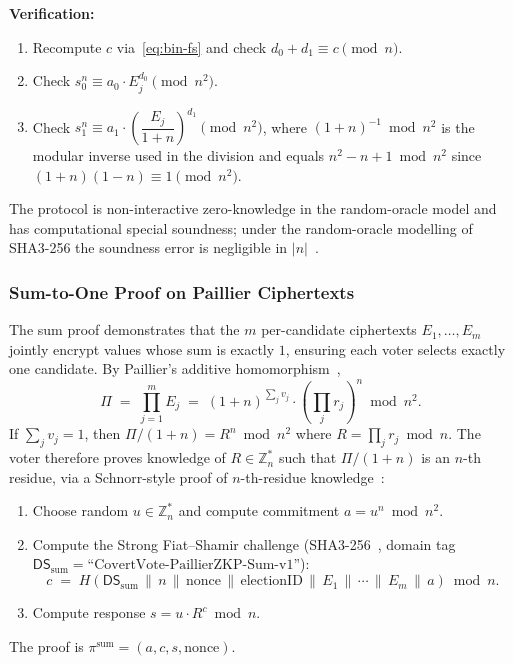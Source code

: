 \textbf{Verification:}
\begin{enumerate}
    \item Recompute $c$ via~\eqref{eq:bin-fs} and check $d_0 + d_1 \equiv c \pmod{n}$.
    \item Check $s_0^{n} \equiv a_0 \cdot E_j^{d_0} \pmod{n^2}$.
    \item Check $s_1^{n} \equiv a_1 \cdot \left(\dfrac{E_j}{1+n}\right)^{d_1} \pmod{n^2}$, where $(1+n)^{-1} \bmod n^2$ is the modular inverse used in the division and equals $n^2 - n + 1 \bmod n^2$ since $(1+n)(1-n) \equiv 1 \pmod{n^2}$.
\end{enumerate}

The protocol is non-interactive zero-knowledge in the random-oracle model and has computational special soundness; under the random-oracle modelling of SHA3-256 the soundness error is negligible in $|n|$~\cite{cramer1994or,damgard_jurik2001}.

\subsubsection{Sum-to-One Proof on Paillier Ciphertexts}
\label{subsubsec:sum-proof}

The sum proof demonstrates that the $m$ per-candidate ciphertexts $E_1, \ldots, E_m$ jointly encrypt values whose sum is exactly $1$, ensuring each voter selects exactly one candidate. By Paillier's additive homomorphism~\cite{paillier1999},
\begin{equation}
    \Pi \;=\; \prod_{j=1}^{m} E_j \;=\; (1+n)^{\sum_j v_j} \cdot \left(\prod_j r_j\right)^{n} \bmod n^2.
\end{equation}
If $\sum_j v_j = 1$, then $\Pi / (1+n) = R^{n} \bmod n^2$ where $R = \prod_j r_j \bmod n$. The voter therefore proves knowledge of $R \in \mathbb{Z}_n^*$ such that $\Pi / (1+n)$ is an $n$-th residue, via a Schnorr-style proof of $n$-th-residue knowledge~\cite{schnorr1991,damgard_jurik2001}:
\begin{enumerate}
    \item Choose random $u \in \mathbb{Z}_n^*$ and compute commitment $a = u^{n} \bmod n^2$.
    \item Compute the Strong Fiat--Shamir challenge (SHA3-256~\cite{nist_fips202}, domain tag $\mathsf{DS}_{\text{sum}} = \text{``CovertVote-PaillierZKP-Sum-v1''}$):
    \begin{equation}
        c \;=\; H(\mathsf{DS}_{\text{sum}} \,\|\, n \,\|\, \text{nonce} \,\|\, \text{electionID} \,\|\, E_1 \,\|\, \cdots \,\|\, E_m \,\|\, a) \bmod n.
        \label{eq:sum-fs}
    \end{equation}
    \item Compute response $s = u \cdot R^{c} \bmod n$.
\end{enumerate}
The proof is $\pi^{\text{sum}} = (a, c, s, \text{nonce})$.

